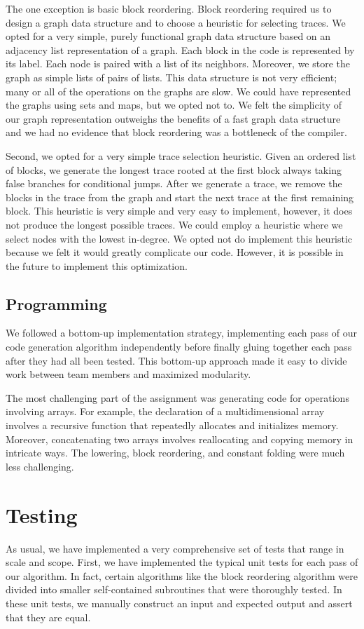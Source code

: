 \documentclass{hw}
\begin{document}
The one exception is basic block reordering. Block reordering required us to
design a graph data structure and to choose a heuristic for selecting traces.
We opted for a very simple, purely functional graph data structure based on an
adjacency list representation of a graph. Each block in the code is represented
by its label. Each node is paired with a list of its neighbors. Moreover, we
store the graph as simple lists of pairs of lists. This data structure is not
very efficient; many or all of the operations on the graphs are slow. We could
have represented the graphs using sets and maps, but we opted not to. We felt
the simplicity of our graph representation outweighs the benefits of a fast
graph data structure and we had no evidence that block reordering was a
bottleneck of the compiler.

Second, we opted for a very simple trace selection heuristic. Given an ordered
list of blocks, we generate the longest trace rooted at the first block always
taking false branches for conditional jumps. After we generate a trace, we
remove the blocks in the trace from the graph and start the next trace at the
first remaining block. This heuristic is very simple and very easy to
implement, however, it does not produce the longest possible traces. We could
employ a heuristic where we select nodes with the lowest in-degree. We opted
not do implement this heuristic because we felt it would greatly complicate our
code. However, it is possible in the future to implement this optimization.

\subsection{Programming}
We followed a bottom-up implementation strategy, implementing each pass of our
code generation algorithm independently before finally gluing together each
pass after they had all been tested. This bottom-up approach made it easy to
divide work between team members and maximized modularity.

The most challenging part of the assignment was generating code for operations
involving arrays. For example, the declaration of a multidimensional array
involves a recursive function that repeatedly allocates and initializes memory.
Moreover, concatenating two arrays involves reallocating and copying memory in
intricate ways. The lowering, block reordering, and constant folding were much
less challenging.

\section{Testing}\label{sec:testing}
As usual, we have implemented a very comprehensive set of tests that range in
scale and scope. First, we have implemented the typical unit tests for each
pass of our algorithm. In fact, certain algorithms like the block reordering
algorithm were divided into smaller self-contained subroutines that were
thoroughly tested. In these unit tests, we manually construct an input and
expected output and assert that they are equal.
\end{document}
